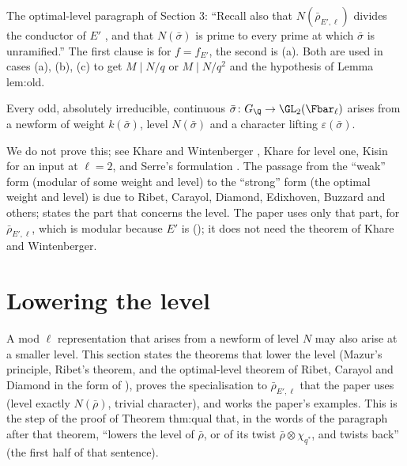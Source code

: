\begin{paperlink}
The optimal-level paragraph of Section 3: ``Recall also that $N(\bar\rho_{E',\ell})$ divides the conductor of $E'$ \cite{Carayol89}, and that $N(\bar\sigma)$ is prime to
every prime at which $\bar\sigma$ is unramified.'' The first clause is  for $f=f_{E'}$, the second is
(a). Both are used in cases (a), (b), (c) to get $M\mid N/q$ or $M\mid N/q^2$ and the hypothesis of Lemma lem:old.
\end{paperlink}

\begin{theorem}\label{thm:modgalrep:serre-conjecture}
Every odd, absolutely irreducible, continuous $\bar\sigma\colon G_\Q\to\GL_2(\Fbar_\ell)$ arises from a newform of weight $k(\bar\sigma)$, level $N(\bar\sigma)$ and a character
lifting $\varepsilon(\bar\sigma)$.
\end{theorem}

We do not prove this; see Khare and Wintenberger \cite{KhareWintenberger}, Khare \cite{Khare} for level one, Kisin \cite{Kisin09} for an input at
$\ell=2$, and Serre's formulation \cite{Serre87}. The passage from the ``weak'' form (modular of some weight and level) to the ``strong'' form
(the optimal weight and level) is due to Ribet, Carayol, Diamond, Edixhoven, Buzzard and others;  states the part
that concerns the level. The paper uses only that part, for $\bar\rho_{E',\ell}$, which is modular because $E'$ is (); it does not need the
theorem of Khare and Wintenberger.

\section{Lowering the level}\label{sec:modgalrep:lowering}

A mod $\ell$ representation that arises from a newform of level $N$ may also arise at a smaller level. This section states the theorems that
lower the level (Mazur's principle, Ribet's theorem, and the optimal-level theorem of Ribet, Carayol and Diamond in the form of
\cite[Theorem 3.15]{DDT}), proves the specialisation to $\bar\rho_{E',\ell}$ that the paper uses (level exactly $N(\bar\rho)$, trivial character), and works the
paper's examples. This is the step of the proof of Theorem thm:qual that, in the words of the paragraph after that theorem, ``lowers the level of $\bar\rho$, or of its twist
$\bar\rho\otimes\chi_{q^*}$, and twists back'' (the first half of that sentence).

